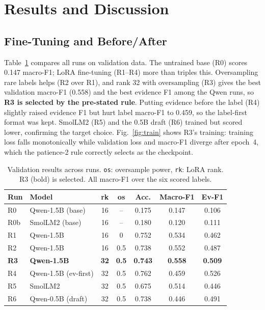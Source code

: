 \documentclass[conference]{IEEEtran}
\begin{document}
\section{Results and Discussion}

\subsection{Fine-Tuning and Before/After}
\label{sec:ftres}
Table~\ref{tab:runs} compares all runs on validation data. The untrained base
(R0) scores 0.147 macro-F1; LoRA fine-tuning (R1--R4) more than triples this.
Oversampling rare labels helps (R2 over R1), and rank 32 with oversampling (R3)
gives the best validation macro-F1 (0.558) and the best evidence F1 among the
Qwen runs, so \textbf{R3 is selected by the pre-stated rule}. Putting evidence
before the label (R4) slightly raised evidence F1 but hurt label macro-F1 to
0.459, so the label-first format was kept. SmolLM2 (R5) and the 0.5B draft (R6)
trained but scored lower, confirming the target choice.
Fig.~\ref{fig:train} shows R3's training: training loss falls monotonically while
validation loss and macro-F1 diverge after epoch~4, which the patience-2 rule
correctly selects as the checkpoint.

\begin{table}[t]
\caption{Validation results across runs. \texttt{os}: oversample power,
\texttt{rk}: LoRA rank. R3 (bold) is selected. All macro-F1 over the six scored
labels.}
\label{tab:runs}
\centering
\small
\begin{tabular}{llccccc}
\toprule
Run & Model & rk & os & Acc. & Macro-F1 & Ev-F1 \\
\midrule
R0  & Qwen-1.5B (base) & 16 & -- & 0.175 & 0.147 & 0.106 \\
R0b & SmolLM2 (base)   & 16 & -- & 0.180 & 0.120 & 0.111 \\
R1  & Qwen-1.5B        & 16 & 0   & 0.752 & 0.534 & 0.462 \\
R2  & Qwen-1.5B        & 16 & 0.5 & 0.738 & 0.552 & 0.487 \\
\textbf{R3} & \textbf{Qwen-1.5B} & \textbf{32} & \textbf{0.5} & \textbf{0.743} & \textbf{0.558} & \textbf{0.509} \\
R4  & Qwen-1.5B (ev-first) & 32 & 0.5 & 0.762 & 0.459 & 0.526 \\
R5  & SmolLM2          & 32 & 0.5 & 0.675 & 0.514 & 0.446 \\
R6  & Qwen-0.5B (draft)& 32 & 0.5 & 0.738 & 0.446 & 0.491 \\
\bottomrule
\end{tabular}
\end{table}
\end{document}
